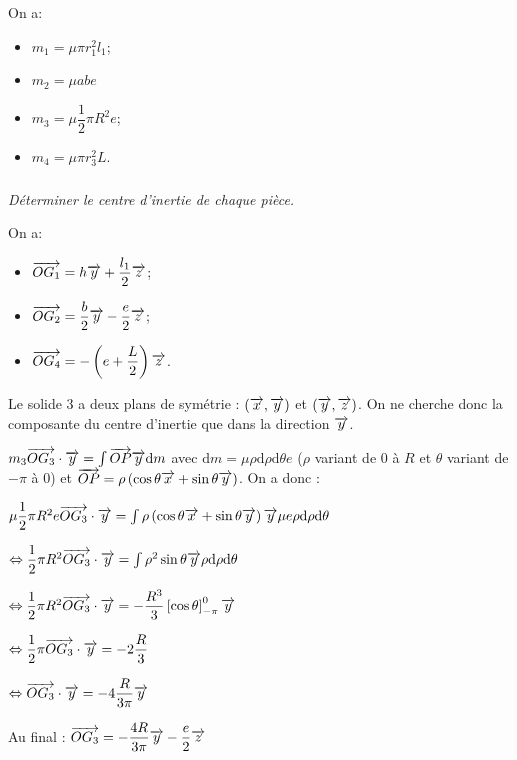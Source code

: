 \documentclass[10pt,fleqn]{article} %
\begin{document}
\begin{multicols}{2}
\begin{corrige}
On a: 
\begin{itemize}
\item $m_1 = \mu \pi r_1^2 l_1$;
\item $m_2 = \mu a b e$
\item $m_3 = \mu \dfrac{1}{2}\pi R^2 e$;
\item $m_4 = \mu \pi r_3^2L$.
\end{itemize}
\end{corrige}


\subparagraph{}\textit{Déterminer le centre d’inertie de chaque pièce.}
\begin{corrige}
On a: 
\begin{itemize}
\item $\overrightarrow{OG_1} = h\overrightarrow{y}+\dfrac{l_1}{2}\overrightarrow{z}$;
\item $\overrightarrow{OG_2} = \dfrac{b}{2}\overrightarrow{y}-\dfrac{e}{2}\overrightarrow{z}$;
\item $\overrightarrow{OG_4} = -\left(e+\dfrac{L}{2}\right)\overrightarrow{z}$.
\end{itemize}

Le solide 3 a deux plans de symétrie : $\left(\overrightarrow{x},\overrightarrow{y}\right)$ et $\left(\overrightarrow{y},\overrightarrow{z}\right)$. On ne cherche donc la composante du centre d'inertie que dans la direction $\overrightarrow{y}$.

$m_3 \overrightarrow{OG_3}\cdot \overrightarrow{y} = \int \overrightarrow{OP}\overrightarrow{y} \text{d}m$ avec $\text{d}m=\mu \rho \text{d}\rho\text{d}\theta e $ ($\rho$ variant de 0 à $R$ et $\theta$ variant de $-\pi$ à 0) et $\overrightarrow{OP}=\rho\left( \cos\theta \overrightarrow{x}+ \sin\theta \overrightarrow{y}\right)$. 
On a donc : 

$ \mu \dfrac{1}{2}\pi R^2 e \overrightarrow{OG_3}\cdot \overrightarrow{y} = \int \rho\left( \cos\theta \overrightarrow{x}+ \sin\theta \overrightarrow{y}\right) \overrightarrow{y} \mu e\rho \text{d}\rho\text{d}\theta $

$ \Leftrightarrow \dfrac{1}{2}\pi R^2  \overrightarrow{OG_3}\cdot \overrightarrow{y} = \int \rho^2 \sin\theta  \overrightarrow{y} \rho \text{d}\rho\text{d}\theta $

$ \Leftrightarrow \dfrac{1}{2}\pi R^2  \overrightarrow{OG_3}\cdot \overrightarrow{y} = -\dfrac{R^3}{3}  \left[\cos\theta \right]_{-\pi}^0  \overrightarrow{y}$

$ \Leftrightarrow \dfrac{1}{2}\pi  \overrightarrow{OG_3}\cdot \overrightarrow{y} = -2\dfrac{R}{3}  $

$ \Leftrightarrow  \overrightarrow{OG_3}\cdot \overrightarrow{y} = -4\dfrac{R}{3\pi}  \overrightarrow{y} $

Au final : 
$\overrightarrow{OG_3} = -\dfrac{4R}{3\pi}  \overrightarrow{y}-\dfrac{e}{2}\overrightarrow{z}$
\end{corrige}


\end{multicols}
\end{document}
